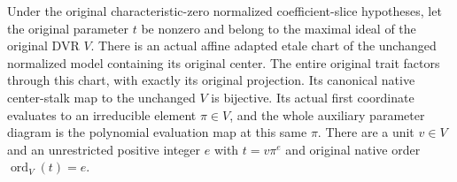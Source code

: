 \begin{theorem}\label{thm:normalized-actual-original-uniformizer-trait}
Under the original characteristic-zero normalized coefficient-slice hypotheses, let the original parameter $t$ be nonzero and belong to the maximal ideal of the original DVR $V$. There is an actual affine adapted etale chart of the unchanged normalized model containing its original center. The entire original trait factors through this chart, with exactly its original projection. Its canonical native center-stalk map to the unchanged $V$ is bijective. Its actual first coordinate evaluates to an irreducible element $\pi\in V$, and the whole auxiliary parameter diagram is the polynomial evaluation map at this same $\pi$. There are a unit $v\in V$ and an unrestricted positive integer $e$ with $t=v\pi^e$ and original native order $\operatorname{ord}_V(t)=e$.
\leanok
\end{theorem}
